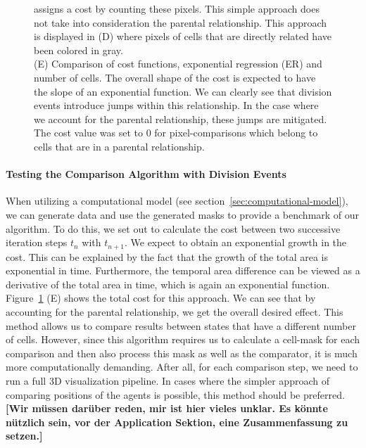 \documentclass[10pt,letterpaper]{article}
\begin{document}
\begin{figure}
{        assigns a cost by counting these pixels.
        This simple approach does not take into consideration the parental relationship.
        This approach is displayed in (D) where pixels of cells that are directly related have been
        colored in gray.\\
        (E) Comparison of cost functions, exponential regression (ER) and number of cells.
        The overall shape of the cost is expected to have the slope of an exponential function.
        We can clearly see that division events introduce jumps within this relationship.
        In the case where we account for the parental relationship, these jumps are mitigated.
        The cost value was set to $0$ for pixel-comparisons which belong to cells that are in a
        parental relationship.
    }
    \label{fig:mask-difference-metric}
\end{figure}

\paragraph{Testing the Comparison Algorithm with Division Events}
When utilizing a computational model (see section~\ref{sec:computational-model}), we can generate
data and use the generated masks to provide a benchmark of our algorithm.
To do this, we set out to calculate the cost between two successive iteration steps
$t_n$ with $t_{n+1}$.
We expect to obtain an exponential growth in the cost.
This can be explained by the fact that the growth of the total area is exponential in time.
Furthermore, the temporal area difference can be viewed as a derivative of the total area in time,
which is again an exponential function.
Figure~\ref{fig:mask-difference-metric} (E) shows the total cost for this approach.
We can see that by accounting for the parental relationship, we get the overall desired effect.
This method allows us to compare results between states that have a different number of cells.
However, since this algorithm requires us to calculate a cell-mask for each comparison and then also
process this mask as well as the comparator, it is much more computationally demanding.
After all, for each comparison step, we need to run a full 3D visualization pipeline.
In cases where the simpler approach of comparing positions of the agents is possible, this method
should be preferred.
\textbf{[Wir müssen darüber reden, mir ist hier vieles unklar. Es könnte nützlich sein, vor der Application Sektion, eine Zusammenfassung zu setzen.]}
\end{document}
